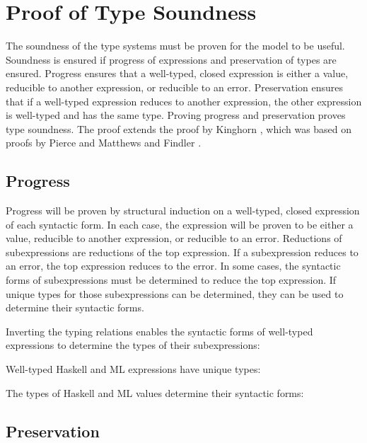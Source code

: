\chapter{Proof of Type Soundness}

The soundness of the type systems must be proven for the model to be useful.  Soundness is ensured if progress of expressions and preservation of types are ensured.  Progress ensures that a well-typed, closed expression is either a value, reducible to another expression, or reducible to an error.  Preservation ensures that if a well-typed expression reduces to another expression, the other expression is well-typed and has the same type.  Proving progress and preservation proves type soundness.  The proof extends the proof by Kinghorn \cite{kinghorn07}, which was based on proofs by Pierce \cite{pierce02} and Matthews and Findler \cite{matthews07}.

\section{Progress}

Progress will be proven by structural induction on a well-typed, closed expression of each syntactic form.  In each case, the expression will be proven to be either a value, reducible to another expression, or reducible to an error.  Reductions of subexpressions are reductions of the top expression.  If a subexpression reduces to an error, the top expression reduces to the error.  In some cases, the syntactic forms of subexpressions must be determined to reduce the top expression.  If unique types for those subexpressions can be determined, they can be used to determine their syntactic forms.

Inverting the typing relations enables the syntactic forms of well-typed expressions to determine the types of their subexpressions:



Well-typed Haskell and ML expressions have unique types:



The types of Haskell and ML values determine their syntactic forms:




\section{Preservation}

